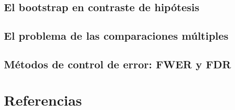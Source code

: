 \documentclass[
  a4paper,
  DIV=11,
  numbers=noendperiod]{scrreprt}
\begin{document}
\section{El bootstrap en contraste de
hipótesis}\label{el-bootstrap-en-contraste-de-hipuxf3tesis}

\section{El problema de las comparaciones
múltiples}\label{el-problema-de-las-comparaciones-muxfaltiples}

\section{Métodos de control de error: FWER y
FDR}\label{muxe9todos-de-control-de-error-fwer-y-fdr}


\chapter{Referencias}\label{referencias-1}
\end{document}
